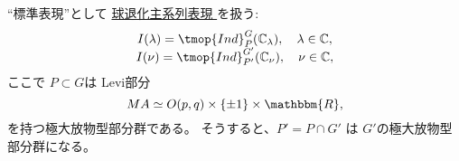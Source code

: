 \begin{frame}{}
``標準表現''として \underline{球退化主系列表現
}を扱う:\begin{equation*}
	\begin{array}[]{c}
		I(\lambda)=\tmop{Ind}_P^G(\mathbb{C}_{\lambda}),\quad \lambda\in\mathbb{C},\\
		I(\nu)=\tmop{Ind}_{P'}^{G'}(\mathbb{C}_{\nu}),\quad \nu\in\mathbb{C},
	\end{array}
\end{equation*}
ここで $P \subset G$は Levi部分
\begin{equation*}
{MA} \simeq O (p, q) \times \{ \pm 1 \}
\times \mathbbm{R},
\end{equation*}
を持つ極大放物型部分群である。
そうすると、$P' = P \cap G'$ は $G'$の極大放物型部分群になる。
\end{frame}
